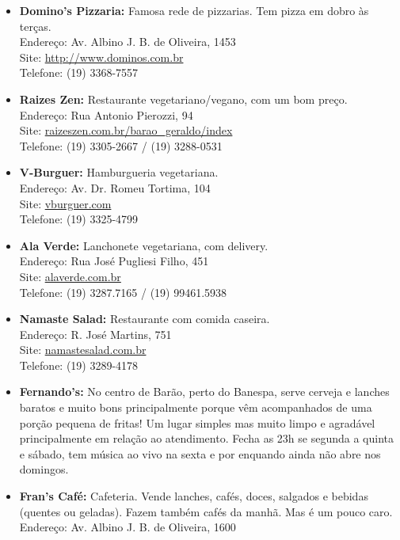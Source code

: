 \begin{itemize}
    \item   \textbf{Domino's Pizzaria:} Famosa rede de pizzarias. Tem pizza 
        em dobro às terças.
        \\Endereço: Av. Albino J. B. de Oliveira, 1453
        \\Site: \url{http://www.dominos.com.br}
        \\Telefone: (19) 3368-7557
    
    \item	\textbf{Raizes Zen:} Restaurante vegetariano/vegano, com um bom
		preço.
		\\Endereço: Rua Antonio Pierozzi, 94
		\\Site: \url{raizeszen.com.br/barao_geraldo/index}
		\\Telefone: (19) 3305-2667 / (19) 3288-0531
	
	\item	\textbf{V-Burguer:} Hamburgueria vegetariana.
		\\Endereço: Av. Dr. Romeu Tortima, 104
		\\Site: \url{vburguer.com}
		\\Telefone: (19) 3325-4799
		
	\item	\textbf{Ala Verde:} Lanchonete vegetariana, com delivery.
		\\Endereço: Rua José Pugliesi Filho, 451
		\\Site: \url{alaverde.com.br}
		\\Telefone: (19) 3287.7165 / (19) 99461.5938
		
	\item	\textbf{Namaste Salad:} Restaurante com comida caseira.
		\\Endereço: R. José Martins, 751
		\\Site: \url{namastesalad.com.br}
		\\Telefone: (19) 3289-4178
	
    \item   \textbf{Fernando's:} No centro de Barão, perto do Banespa, serve
        cerveja e lanches baratos e muito bons principalmente porque vêm
        acompanhados de uma porção pequena de fritas! Um lugar simples mas muito
        limpo e agradável principalmente em relação ao atendimento. Fecha as 23h
        se segunda a quinta e sábado, tem música ao vivo na sexta e por enquando
        ainda não abre nos domingos.

    \item   \textbf{Fran's Café:} Cafeteria. Vende lanches, cafés, doces,
        salgados e bebidas (quentes ou geladas). Fazem também cafés da manhã.
        Mas é um pouco caro.
        \\Endereço: Av. Albino J. B. de Oliveira, 1600 


\end{itemize}
